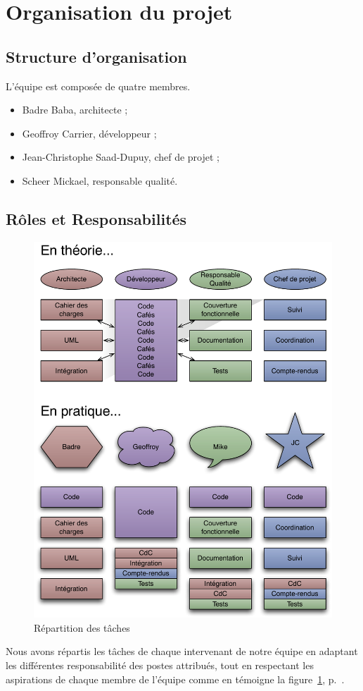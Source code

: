 
\section{Organisation du projet}
\subsection{Structure d’organisation}
L'équipe est composée de quatre membres.
\begin{itemize}
	\item Badre Baba, architecte ;
	\item Geoffroy Carrier, développeur ;
	\item Jean-Christophe Saad-Dupuy, chef de projet ;
	\item Scheer Mickael, responsable qualité.
\end{itemize}

\subsection{Rôles et Responsabilités}
\begin{figure}[thbp]
	\centering
		\includegraphics[width=15cm]{../diagrammes/repartition_taches.pdf}
	\caption{Répartition des tâches}
	\label{fig:repartition}
\end{figure}

Nous avons répartis les tâches de chaque intervenant de notre équipe en adaptant les différentes responsabilité des postes attribués, tout en respectant les aspirations de chaque membre de l'équipe comme en témoigne la figure~\ref{fig:repartition},
p.~\pageref{fig:repartition}.
